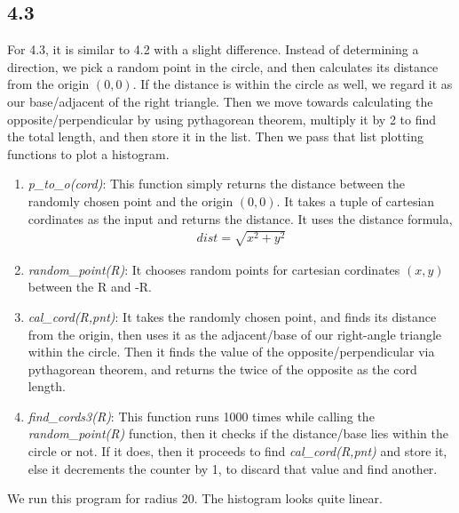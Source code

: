 \documentclass[answers]{exam}
\begin{document}
    \subsection*{4.3}
    \begin{framed}
        For 4.3, it is similar to 4.2 with a slight difference. Instead of determining a direction, we pick a random point in the circle, and then calculates its distance from the origin $(0,0)$. If the distance is within the circle as well, we regard it as our base/adjacent of the right triangle. Then we move towards calculating the opposite/perpendicular by using pythagorean theorem, multiply it by 2 to find the total length, and then store it in the list. Then we pass that list plotting functions to plot a histogram.
        \begin{enumerate}
            \item \emph{p\_to\_o(cord)}: This function simply returns the distance between the randomly chosen point and the origin $(0,0)$. It takes a tuple of cartesian cordinates as the input and returns the distance. It uses the distance formula,
                \begin{align*}
                    dist=\sqrt{x^2+y^2}
                \end{align*}
            \item \emph{random\_point(R)}: It chooses random points for cartesian cordinates $(x,y)$ between the R and -R.
            \item \emph{cal\_cord(R,pnt)}: It takes the randomly chosen point, and finds its distance from the origin, then uses it as the adjacent/base of our right-angle triangle within the circle. Then it finds the value of the opposite/perpendicular via pythagorean theorem, and returns the twice of the opposite as the cord length.
            \item \emph{find\_cords3(R)}: This function runs 1000 times while calling the \emph{random\_point(R)} function, then it checks if the distance/base lies within the circle or not. If it does, then it proceeds to find \emph{cal\_cord(R,pnt)} and store it, else it decrements the counter by 1, to discard that value and find another.
        \end{enumerate}
        We run this program for radius 20. The histogram looks quite linear.
    \end{framed}
    
\end{document}
